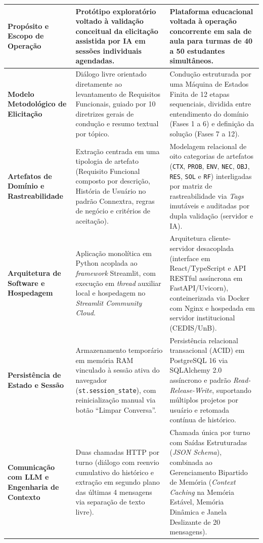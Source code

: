 {\begin{xltabular}{\textwidth}{|>{\raggedright\arraybackslash}p{2.8cm}|>{\raggedright\arraybackslash}X|>{\raggedright\arraybackslash}X|}
    \textbf{Propósito e Escopo de Operação} & Protótipo exploratório voltado à validação conceitual da elicitação assistida por IA em sessões individuais agendadas. & Plataforma educacional voltada à operação concorrente em sala de aula para turmas de 40 a 50 estudantes simultâneos. \\
    \midrule
    \textbf{Modelo Metodológico de Elicitação} & Diálogo livre orientado diretamente ao levantamento de Requisitos Funcionais, guiado por 10 diretrizes gerais de condução e resumo textual por tópico. & Condução estruturada por uma Máquina de Estados Finita de 12 etapas sequenciais, dividida entre entendimento do domínio (Fases 1 a 6) e definição da solução (Fases 7 a 12). \\
    \midrule
    \textbf{Artefatos de Domínio e Rastreabilidade} & Extração centrada em uma tipologia de artefato (Requisito Funcional composto por descrição, História de Usuário no padrão Connextra, regras de negócio e critérios de aceitação). & Modelagem relacional de oito categorias de artefatos (\texttt{CTX}, \texttt{PROB}, \texttt{ENV}, \texttt{NEC}, \texttt{OBJ}, \texttt{RES}, \texttt{SOL} e \texttt{RF}) interligadas por matriz de rastreabilidade via \textit{Tags} imutáveis e auditadas por dupla validação (servidor e IA). \\
    \midrule
    \textbf{Arquitetura de Software e Hospedagem} & Aplicação monolítica em Python acoplada ao \textit{framework} Streamlit, com execução em \textit{thread} auxiliar local e hospedagem no \textit{Streamlit Community Cloud}. & Arquitetura cliente-servidor desacoplada (interface em React/TypeScript e API RESTful assíncrona em FastAPI/Uvicorn), conteinerizada via Docker com Nginx e hospedada em servidor institucional (CEDIS/UnB). \\
    \midrule
    \textbf{Persistência de Estado e Sessão} & Armazenamento temporário em memória RAM vinculado à sessão ativa do navegador (\texttt{st.\allowbreak session\_\allowbreak state}), com reinicialização manual via botão ``Limpar Conversa''. & Persistência relacional transacional (ACID) em PostgreSQL 16 via SQLAlchemy 2.0 assíncrono e padrão \textit{Read-Release-Write}, suportando múltiplos projetos por usuário e retomada contínua de histórico. \\
    \midrule
    \textbf{Comunicação com LLM e Engenharia de Contexto} & Duas chamadas HTTP por turno (diálogo com reenvio cumulativo do histórico e extração em segundo plano das últimas 4 mensagens via separação de texto livre). & Chamada única por turno com Saídas Estruturadas (\textit{JSON Schema}), combinada ao Gerenciamento Bipartido de Memória (\textit{Context Caching} na Memória Estável, Memória Dinâmica e Janela Deslizante de 20 mensagens). \\

\end{xltabular}}
